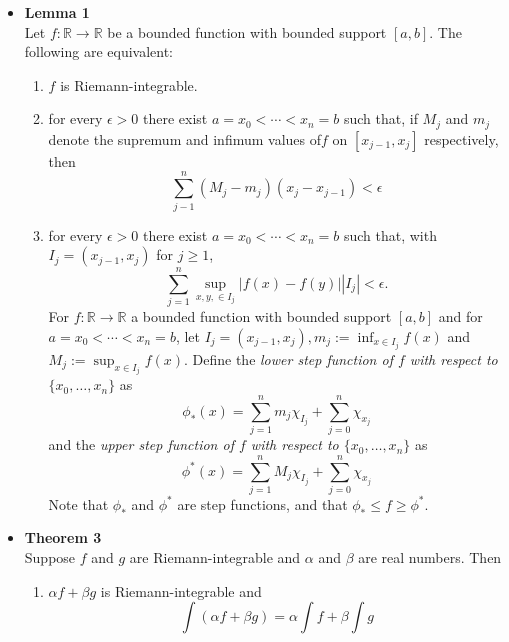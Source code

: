 \documentclass[11pt,a4paper]{article}
\begin{document}
\begin{itemize}
    \item \textbf{Lemma 1} \\
        Let $f : \mathbb{R} \to \mathbb{R}$ be a bounded function with bounded support
        $[a, b]$.
        The following are equivalent:
        \begin{enumerate}
            \item $f$ is Riemann-integrable.
            \item for every $\epsilon > 0$ there exist $a = x_0 < \cdots < x_n = b$ such that,
                if $M_j$ and $m_j$ denote the supremum and infimum values of$f$ on
                $[x_{j-1}, x_j]$ respectively, then
                \[
                    \sum_{j-1}^n (M_j - m_j) (x_j - x_{j-1}) < \epsilon
                \]
            \item for every $\epsilon > 0$ there exist $a = x_0 < \cdots < x_n = b$
                such that, with $I_j = (x_{j-1}, x_j)$ for $j \geq 1$,
                \[
                    \sum_{j=1}^n \sup_{x, y, \in I_j} |f(x) - f(y)| |I_j| < \epsilon.
                \]
                For $f : \mathbb{R} \to \mathbb{R}$ a bounded function with bounded support
                $[a, b]$ and for $a = x_0 < \cdots < x_n = b$,
                let $I_j = (x_{j-1}, x_j), m_j := \inf_{x \in I_j} f(x)$ and
                $M_j := \sup_{x \in I_j} f(x)$.
                Define the \emph{lower step function of $f$ with respect to
                $\{x_0, \ldots, x_n\}$} as
                \[
                    \phi_*(x) = \sum_{j=1}^n m_j \chi_{I_j} + \sum_{j=0}^n \chi_{x_j}
                \]
                and the \emph{upper step function of $f$ with respect to
                $\{x_0, \ldots, x_n\}$} as
                \[
                    \phi^*(x) = \sum_{j=1}^n M_j \chi_{I_j} + \sum_{j=0}^n \chi_{x_j}
                \]
                Note that $\phi_*$ and $\phi^*$ are step functions, and that
                $\phi_* \leq f \geq \phi^*$.

        \end{enumerate}

    \item \textbf{Theorem 3} \\
        Suppose $f$ and $g$ are Riemann-integrable and $\alpha$ and $\beta$ are real numbers.
        Then
        \begin{enumerate}
            \item $\alpha f + \beta g$ is Riemann-integrable and
                \[
                    \int(\alpha f + \beta g) = \alpha \int f + \beta \int g
                \]


\end{enumerate}
\end{itemize}
\end{document}
